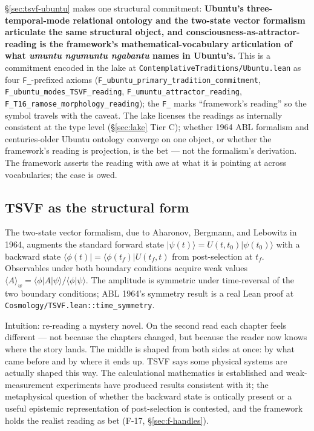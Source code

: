 \documentclass[11pt,a4paper]{article}
\begin{document}
\S\ref{sec:tsvf-ubuntu} makes one structural commitment: \textbf{Ubuntu's three-temporal-mode relational ontology and the two-state vector formalism articulate the same structural object, and consciousness-as-attractor-reading is the framework's mathematical-vocabulary articulation of what \emph{umuntu ngumuntu ngabantu} names in Ubuntu's.} This is a commitment encoded in the lake at \texttt{ContemplativeTraditions/Ubuntu.lean} as four \texttt{F\_}-prefixed axioms (\texttt{F\_ubuntu\_primary\_tradition\_commitment}, \texttt{F\_ubuntu\_modes\_TSVF\_reading}, \texttt{F\_umuntu\_attractor\_reading}, \texttt{F\_T16\_ramose\_morphology\_reading}); the \texttt{F\_} marks ``framework's reading'' so the symbol travels with the caveat. The lake licenses the readings as internally consistent at the type level (\S\ref{sec:lake} Tier C); whether 1964 ABL formalism and centuries-older Ubuntu ontology converge on one object, or whether the framework's reading is projection, is the bet --- not the formalism's derivation. The framework asserts the reading with awe at what it is pointing at across vocabularies; the case is owed.

\subsection*{TSVF as the structural form}

The two-state vector formalism, due to Aharonov, Bergmann, and Lebowitz in 1964, augments the standard forward state $|\psi(t)\rangle = U(t, t_0) |\psi(t_0)\rangle$ with a backward state $\langle \phi(t) | = \langle \phi(t_f) | U(t_f, t)$ from post-selection at $t_f$. Observables under both boundary conditions acquire weak values $\langle A \rangle_w = \langle \phi | A | \psi \rangle / \langle \phi | \psi \rangle$. The amplitude is symmetric under time-reversal of the two boundary conditions; ABL 1964's symmetry result is a real Lean proof at \texttt{Cosmology/TSVF.lean::time\_symmetry}.

Intuition: re-reading a mystery novel. On the second read each chapter feels different --- not because the chapters changed, but because the reader now knows where the story lands. The middle is shaped from both sides at once: by what came before and by where it ends up. TSVF says some physical systems are actually shaped this way. The calculational mathematics is established and weak-measurement experiments have produced results consistent with it; the metaphysical question of whether the backward state is ontically present or a useful epistemic representation of post-selection is contested, and the framework holds the realist reading as bet (F-17, \S\ref{sec:f-handles}).
\end{document}
